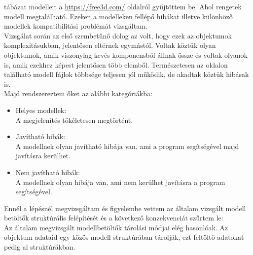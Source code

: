  tábázat modelleit a \url{https://free3d.com/} oldalról gyűjtöttem be. Ahol rengetek modell megtalálható. Ezeken a modelleken fellépő hibákat illetve különböző modellek kompatibilitási problémát vizsgáltam.\\

Vizsgálat során az  első szembetűnő dolog az volt, hogy ezek az objektumok komplexitásukban, jelentősen eltérnek egymástól. Voltak köztük olyan objektumok, amik viszonylag kevés komponensből állnak össze és voltak olyanok is, amik ezekhez képest jelentősen több elemből.
Természetesen az oldalon található modell fájlok többsége teljesen jól működik, de akadtak köztük hibásak is.\\

Majd rendszereztem őket az alábbi kategóriákba:
\begin{itemize}
\item Helyes modellek:\\
A megjelenítés tökéletesen megtörtént.
\bigskip
\item Javítható hibák:\\
A modellnek olyan javítható hibája van, ami a program segítségével majd javításra kerülhet.
\bigskip
\item Nem javítható hibák:\\
A modellnek olyan hibája van, ami nem kerülhet javításra a program segítségével.
\end{itemize}
\bigskip

\newpage


\noindent Ennél a lépésnél megvizsgáltam és figyelembe vettem az általam vizsgált modell betöltők struktúrális felépítését és a következő konzekvenciát szűrtem le:\\

Az általam megvizsgált modellbetöltők tárolási módjai elég hasonlóak. Az objektum adataid egy közös modell struktúrában tárolják, ezt feltöltő adatokat pedig al struktúrákban.\\

